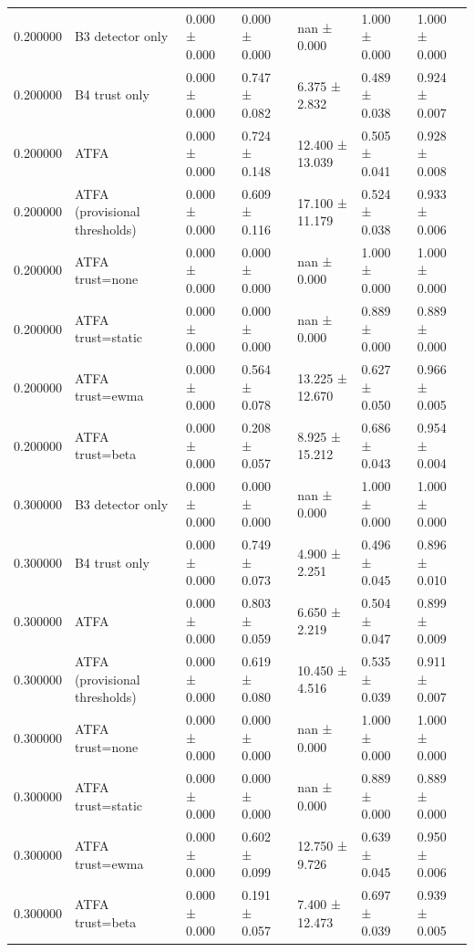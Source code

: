\begin{tabular}{rllllll}
0.200000 & B3 detector only & 0.000 ± 0.000 & 0.000 ± 0.000 & nan ± 0.000 & 1.000 ± 0.000 & 1.000 ± 0.000 \\
0.200000 & B4 trust only & 0.000 ± 0.000 & 0.747 ± 0.082 & 6.375 ± 2.832 & 0.489 ± 0.038 & 0.924 ± 0.007 \\
0.200000 & ATFA & 0.000 ± 0.000 & 0.724 ± 0.148 & 12.400 ± 13.039 & 0.505 ± 0.041 & 0.928 ± 0.008 \\
0.200000 & ATFA (provisional thresholds) & 0.000 ± 0.000 & 0.609 ± 0.116 & 17.100 ± 11.179 & 0.524 ± 0.038 & 0.933 ± 0.006 \\
0.200000 & ATFA trust=none & 0.000 ± 0.000 & 0.000 ± 0.000 & nan ± 0.000 & 1.000 ± 0.000 & 1.000 ± 0.000 \\
0.200000 & ATFA trust=static & 0.000 ± 0.000 & 0.000 ± 0.000 & nan ± 0.000 & 0.889 ± 0.000 & 0.889 ± 0.000 \\
0.200000 & ATFA trust=ewma & 0.000 ± 0.000 & 0.564 ± 0.078 & 13.225 ± 12.670 & 0.627 ± 0.050 & 0.966 ± 0.005 \\
0.200000 & ATFA trust=beta & 0.000 ± 0.000 & 0.208 ± 0.057 & 8.925 ± 15.212 & 0.686 ± 0.043 & 0.954 ± 0.004 \\
0.300000 & B3 detector only & 0.000 ± 0.000 & 0.000 ± 0.000 & nan ± 0.000 & 1.000 ± 0.000 & 1.000 ± 0.000 \\
0.300000 & B4 trust only & 0.000 ± 0.000 & 0.749 ± 0.073 & 4.900 ± 2.251 & 0.496 ± 0.045 & 0.896 ± 0.010 \\
0.300000 & ATFA & 0.000 ± 0.000 & 0.803 ± 0.059 & 6.650 ± 2.219 & 0.504 ± 0.047 & 0.899 ± 0.009 \\
0.300000 & ATFA (provisional thresholds) & 0.000 ± 0.000 & 0.619 ± 0.080 & 10.450 ± 4.516 & 0.535 ± 0.039 & 0.911 ± 0.007 \\
0.300000 & ATFA trust=none & 0.000 ± 0.000 & 0.000 ± 0.000 & nan ± 0.000 & 1.000 ± 0.000 & 1.000 ± 0.000 \\
0.300000 & ATFA trust=static & 0.000 ± 0.000 & 0.000 ± 0.000 & nan ± 0.000 & 0.889 ± 0.000 & 0.889 ± 0.000 \\
0.300000 & ATFA trust=ewma & 0.000 ± 0.000 & 0.602 ± 0.099 & 12.750 ± 9.726 & 0.639 ± 0.045 & 0.950 ± 0.006 \\
0.300000 & ATFA trust=beta & 0.000 ± 0.000 & 0.191 ± 0.057 & 7.400 ± 12.473 & 0.697 ± 0.039 & 0.939 ± 0.005 \\
\bottomrule
\end{tabular}
